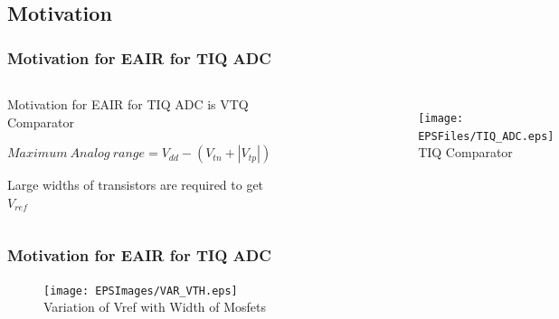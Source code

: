 \subsection*{Motivation}
\begin{frame}
	\frametitle{Motivation for EAIR for TIQ ADC}
	\begin{center}
		\begin{columns}[c]
		\column{2.5in}
			\begin{itemize}
				\small{\item{Motivation for EAIR for TIQ ADC is VTQ Comparator}
				\item{$Maximum\ Analog\ range=V_{dd}-(V_{tn}+|V_{tp}|)$}
				\item{Large widths of transistors are required to get $V_{ref}$}
       				}
 			\end{itemize}
			\begin{figure}
				\begin{center}
                		\end{center}
			\end{figure}			
		\column{2.5in}
			\begin{figure}
				\begin{center}
				\texttt{[image: EPSFiles/TIQ\_ADC.eps]}\\
               			\small{TIQ Comparator}
				\end{center}
			\end{figure}
		\end{columns}
	\end{center}	
\end{frame}
\begin{frame}
	\frametitle{Motivation for EAIR for TIQ ADC}
	\begin{center}
		\begin{figure}
		\texttt{[image: EPSImages/VAR\_VTH.eps]}\\
		\small{Variation of Vref with Width of Mosfets}
		\end{figure}	
	\end{center}
\end{frame}

